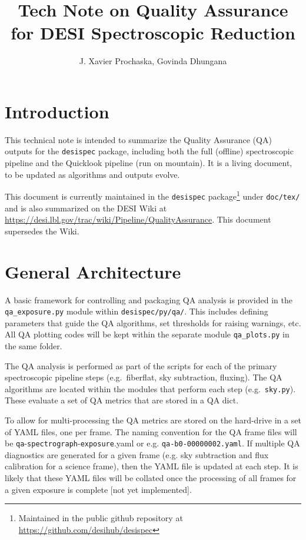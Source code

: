 \documentclass[12pt]{article}
\title{Tech Note on Quality Assurance for DESI Spectroscopic Reduction \\
\vspace{5mm}{\large\bf DESI-doc-XXX-v1.1}}
\author{J. Xavier Prochaska, Govinda Dhungana}
\begin{document}
\maketitle

\section{Introduction}

This technical note is intended to summarize 
the Quality Assurance (QA) outputs for the
{\tt desispec} package, including both the full (offline)
spectroscopic pipeline and the Quicklook pipeline 
(run on mountain).  It is a living document, to be
updated as algorithms and outputs evolve.

This document is currently
maintained in the {\tt desispec} 
package\footnote{Maintained in the public github repository at \url{https://github.com/desihub/desispec}} under {\tt doc/tex/}
and is also summarized on the DESI Wiki at 
\url{https://desi.lbl.gov/trac/wiki/Pipeline/QualityAssurance}. 
This document supersedes the Wiki.

\section{General Architecture}

A basic framework for controlling and packaging
QA analysis is provided in the
{\tt qa\_exposure.py} module
within {\tt desispec/py/qa/}.
This includes defining parameters that guide the QA
algorithms, set thresholds for raising warnings, etc.
All QA plotting codes will be kept within the separate
module {\tt qa\_plots.py} in the same folder.

The QA analysis is performed as part of the scripts for each
of the primary spectroscopic pipeline steps (e.g.\ fiberflat,
sky subtraction, fluxing).   The QA algorithms are located 
within the modules that perform each step (e.g.\ {\tt sky.py}).
These evaluate a set of QA metrics that are stored
in a QA dict.

To allow for multi-processing the QA metrics are stored
on the hard-drive in a set of YAML files, one per frame.
The naming convention for the QA frame files 
will be
{\tt qa}-{\tt spectrograph}-{\tt exposure}.yaml or
e.g. {\tt qa-b0-00000002.yaml}.
If multiple QA diagnostics are generated for a given
frame (e.g. sky subtraction and flux calibration for
a science frame), then the YAML file is updated 
at each step.
It is likely that these YAML files will be collated
once the processing of all frames for 
a given exposure is complete
[not yet implemented].
\end{document}

